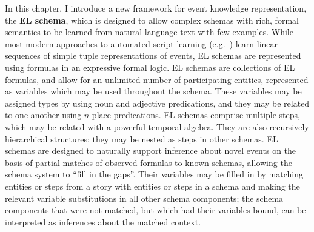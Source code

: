 
In this chapter, I introduce a new framework for event knowledge representation, the \textbf{EL schema}, which is designed to allow complex schemas with rich, formal semantics to be learned from natural language text with few examples.
While most modern approaches to automated script learning (e.g.~\cite{chambers2011ACL,pichotta2016WS,yuan2018OEP}) learn linear sequences of simple tuple representations of events, EL schemas are represented using formulas in an expressive formal logic.
EL schemas are collections of EL formulas, and allow for an unlimited number of participating entities, represented as variables which may be used throughout the schema.
These variables may be assigned types by using noun and adjective predications, and they may be related to one another using $n$-place predications.
EL schemas comprise multiple steps, which may be related with a powerful temporal algebra.
They are also recursively hierarchical structures; they may be nested as steps in other schemas. EL schemas are designed to naturally support inference about novel events on the basis of partial matches of observed formulas to known schemas, allowing the schema system to ``fill in the gaps''.
Their variables may be filled in by matching entities or steps from a story with entities or steps in a schema and making the relevant variable substitutions in all other schema components; the schema components that were not matched, but which had their variables bound, can be interpreted as inferences about the matched context.

